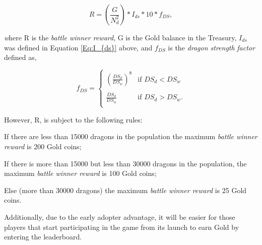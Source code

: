 \documentclass[12pt]{article}
\begin{document}
{\begin{center}
  \begin{equation}\label{Eq:R}
    R=\left(\frac{G}{N_d^2}\right)*I_{ds}*10*f_{DS},
  \end{equation}
\end{center}

\vspace{\baselineskip}
\textit{w}here R is the \textit{battle winner reward}, G is the Gold balance in the Treasury, $I_{ds}$ was defined in Equation \ref{Eq:I_{ds}} above, and $f_{DS}$ is the \textit{dragon strength} \textit{factor} defined as,\par


\begin{center}
  \begin{equation}
   f_{DS}=\begin{cases}
     \left(\frac{DS_{d}}{DS_{w}}\right)^8 & \mbox{if }  DS_{d} < DS_{w}\\
     \\
     \frac{DS_{d}}{DS_{w}} & \mbox{if } DS_{d}>DS_{w}.\\
    \end{cases}
  \end{equation}
\end{center}

\vspace{\baselineskip}
However, R, is subject to the following rules:\par

\begin{itemize}
  \begin{samepage}
	\item If there are less than 15000 dragons in the population the maximum \textit{battle winner reward} is 200 Gold coins;\par

	\item If there is more than 15000 but less than 30000 dragons in the population, the maximum \textit{battle winner reward} is 100 Gold coins;\par

	\item Else (more than 30000 dragons) the maximum \textit{battle winner reward} is 25 Gold coins.
  \end{samepage}
\end{itemize}\par

Additionally, due to the early adopter advantage, it will be easier for those players that start participating in the game from its launch to earn Gold by entering the leaderboard.

}
\end{document}
